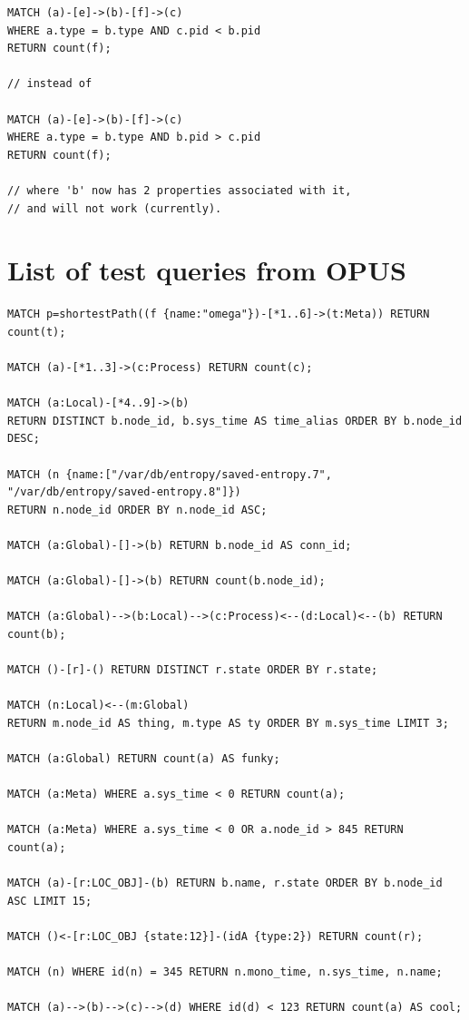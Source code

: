 \documentclass[letterpaper]{ltxdoc}
\begin{document}
\begin{lstlisting}[language = Cypher]
MATCH (a)-[e]->(b)-[f]->(c)
WHERE a.type = b.type AND c.pid < b.pid
RETURN count(f);

// instead of

MATCH (a)-[e]->(b)-[f]->(c)
WHERE a.type = b.type AND b.pid > c.pid
RETURN count(f);

// where 'b' now has 2 properties associated with it,
// and will not work (currently).
\end{lstlisting}

\section{List of test queries from OPUS}
\begin{verbatim}
MATCH p=shortestPath((f {name:"omega"})-[*1..6]->(t:Meta)) RETURN count(t);

MATCH (a)-[*1..3]->(c:Process) RETURN count(c);

MATCH (a:Local)-[*4..9]->(b)
RETURN DISTINCT b.node_id, b.sys_time AS time_alias ORDER BY b.node_id DESC;

MATCH (n {name:["/var/db/entropy/saved-entropy.7", "/var/db/entropy/saved-entropy.8"]})
RETURN n.node_id ORDER BY n.node_id ASC;

MATCH (a:Global)-[]->(b) RETURN b.node_id AS conn_id;

MATCH (a:Global)-[]->(b) RETURN count(b.node_id);

MATCH (a:Global)-->(b:Local)-->(c:Process)<--(d:Local)<--(b) RETURN count(b);

MATCH ()-[r]-() RETURN DISTINCT r.state ORDER BY r.state;

MATCH (n:Local)<--(m:Global)
RETURN m.node_id AS thing, m.type AS ty ORDER BY m.sys_time LIMIT 3;

MATCH (a:Global) RETURN count(a) AS funky;

MATCH (a:Meta) WHERE a.sys_time < 0 RETURN count(a);

MATCH (a:Meta) WHERE a.sys_time < 0 OR a.node_id > 845 RETURN count(a);

MATCH (a)-[r:LOC_OBJ]-(b) RETURN b.name, r.state ORDER BY b.node_id ASC LIMIT 15;

MATCH ()<-[r:LOC_OBJ {state:12}]-(idA {type:2}) RETURN count(r);

MATCH (n) WHERE id(n) = 345 RETURN n.mono_time, n.sys_time, n.name;

MATCH (a)-->(b)-->(c)-->(d) WHERE id(d) < 123 RETURN count(a) AS cool;


\end{verbatim}
\end{document}
